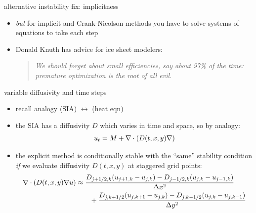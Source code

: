 \begin{frame}{alternative instability fix: implicitness}
\begin{itemize}
\small
\item \emph{but} for implicit and Crank-Nicolson methods you have to solve systems of equations to take each step
\medskip

\item \scriptsize Donald Knuth has advice for ice sheet modelers: \begin{quote}
\emph{We should forget about small efficiencies, say about 97\% of the time: premature optimization is the root of all evil}.
\end{quote}
\end{itemize}
\end{frame}


\begin{frame}{variable diffusivity and time steps}

\begin{itemize}
  \item recall analogy \qquad (SIA) $\leftrightarrow$ (heat eqn)
  \item the SIA has a diffusivity $D$ which varies in time and space, so by analogy:
  		$$u_t = M + \nabla\cdot \left(D(t,x,y) \nabla \right)$$
  \item the explicit method is conditionally stable with the ``same'' stability condition \emph{if} we evaluate diffusivity $D(t,x,y)$ at \alert{staggered} grid points:
  \scriptsize
\begin{align*}
\nabla\cdot \left(D(t,x,y) \nabla u\right) &\approx \frac{D_{j+1/2,k}(u_{j+1,k} - u_{j,k}) - D_{j-1/2,k}(u_{j,k} - u_{j-1,k})}{\Delta x^2} \\
	&\qquad + \frac{D_{j,k+1/2}(u_{j,k+1} - u_{j,k}) - D_{j,k-1/2}(u_{j,k} - u_{j,k-1})}{\Delta y^2}
\end{align*}
\end{itemize}


\end{frame}

